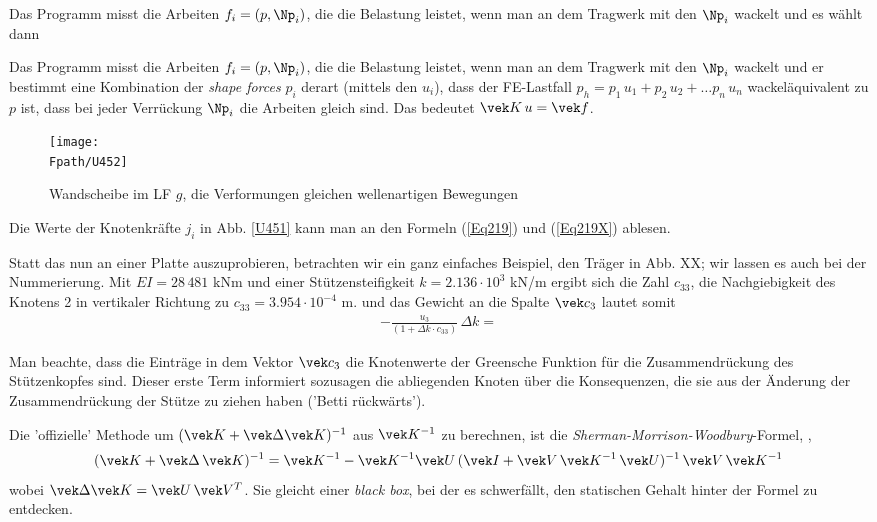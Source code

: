 {{{{{Das Programm misst die Arbeiten $f_i = (p,\Np_i)$, die die Belastung leistet, wenn man an dem Tragwerk mit den $\Np_i$ wackelt und es w\"{a}hlt dann

Das Programm misst die Arbeiten $f_i = (p,\Np_i)$, die die Belastung leistet, wenn man an dem Tragwerk mit den $\Np_i$ wackelt und er bestimmt eine Kombination der {\em shape forces\/} $p_i$ derart (mittels den $u_i$), dass der FE-Lastfall $p_h = p_1\,u_1 + p_2\,u_2 + \ldots p_n\,u_n$ wackel\"{a}quivalent zu $p$ ist, dass bei jeder Verr\"{u}ckung $\Np_i$ die Arbeiten gleich sind. Das bedeutet $\vek K\,u = \vek f$.


\begin{figure}[tbp]
\centering
\texttt{[image: \\Fpath/U452]}
\caption{Wandscheibe im LF $g$, die Verformungen gleichen wellenartigen Bewegungen} \label{U452}
\end{figure}%


Die Werte der Knotenkr\"{a}fte $j_i$ in Abb. \ref{U451} kann man an den Formeln (\ref{Eq219}) und (\ref{Eq219X}) ablesen.

Statt das nun an einer Platte auszuprobieren, betrachten wir ein ganz einfaches Beispiel, den Tr\"{a}ger in Abb. XX; wir lassen es auch bei der Nummerierung. Mit $EI = 28\,481$ kNm und einer St\"{u}tzensteifigkeit $k = 2.136 \cdot 10^3$ kN/m ergibt sich die Zahl $c_{33}$, die Nachgiebigkeit des Knotens 2 in vertikaler Richtung zu $c_{33} = 3.954 \cdot 10^{-4}$ m.  und das Gewicht an die Spalte $\vek c_3$ lautet somit
\begin{align}
-\frac{u_3}{(1 + \Delta k \cdot c_{33})}\,\Delta k =
\end{align}


Man beachte, dass die Eintr\"{a}ge in dem Vektor $\vek c_3$ die Knotenwerte der Greensche Funktion f\"{u}r die Zusammendr\"{u}ckung des St\"{u}tzenkopfes sind. Dieser erste Term informiert sozusagen die abliegenden Knoten \"{u}ber die Konsequenzen, die sie aus der \"{A}nderung der Zusammendr\"{u}ckung der St\"{u}tze zu ziehen haben ('Betti r\"{u}ckw\"{a}rts').


Die 'offizielle' Methode um $(\vek K + \vek \Delta \vek K)^{-1}$ aus $\vek K^{-1}$ zu berechnen, ist die {\em Sherman-Morrison-Woodbury\/}-Formel, \cite{Golub},\label{Korrektur14}
\begin{align}
(\vek K + \vek \Delta\,\vek K)^{-1} = \vek K^{-1} - \vek K^{-1} \vek U\,(\vek I + \vek V\,\vek K^{-1}\,\vek U)^{-1} \,\vek V\,\vek K^{-1}
\end{align}
wobei $\vek \Delta \vek K = \vek U\,\vek V^T$. Sie gleicht einer {\em black box\/}, bei der es schwerf\"{a}llt, den statischen Gehalt hinter der Formel zu entdecken.



}}}}}
